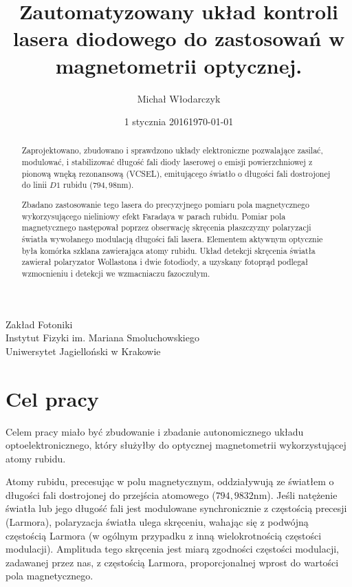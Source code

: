\documentclass[a4paper,10pt]{article}
\date{1 stycznia 2016}
\title{Zautomatyzowany układ kontroli lasera diodowego do zastosowań w magnetometrii optycznej.}
\author{Michał Włodarczyk}
\date{\footnotesize{\today}}
\begin{document}



\maketitle
\vspace{0.25\textheight}
\begin{large}
\centering
Zakład Fotoniki\\
Instytut Fizyki im. Mariana Smoluchowskiego\\
Uniwersytet Jagielloński w Krakowie\\
\end{large}
\thispagestyle{empty}

\newpage
\tableofcontents
\thispagestyle{plain}
\setcounter{page}{1}
\newpage

\begin{abstract}
Zaprojektowano, zbudowano i sprawdzono układy elektroniczne pozwalające zasilać, modulować, i stabilizować długość fali diody laserowej o emisji powierzchniowej z pionową wnęką rezonansową (VCSEL), emitującego światło o długości fali dostrojonej do linii $D1$ rubidu ($794{,}98 \mathrm{nm}$).

Zbadano zastosowanie tego lasera do precyzyjnego pomiaru pola magnetycznego wykorzysującego nieliniowy efekt Faradaya w parach rubidu. Pomiar pola magnetycznego następował poprzez obserwację skręcenia płaszczyzny polaryzacji światła wywołanego modulacją długości fali lasera. Elementem aktywnym optycznie była komórka szklana zawierająca atomy rubidu.  Układ detekcji skręcenia światła zawierał polaryzator Wollastona i dwie fotodiody, a uzyskany fotoprąd podlegał wzmocnieniu i detekcji we wzmacniaczu fazoczułym.  
\end{abstract}

\section{Cel pracy}

Celem pracy miało być zbudowanie i zbadanie autonomicznego układu optoelektronicznego, który służyłby do optycznej magnetometrii wykorzystującej atomy rubidu.

Atomy rubidu, precesując w polu magnetycznym, oddziaływują ze światłem o długości fali dostrojonej do przejścia atomowego ($794{,}9832$nm).
Jeśli natężenie światła lub jego długość fali jest modulowane synchronicznie z częstością precesji (Larmora), polaryzacja światła ulega skręceniu, wahając się z podwójną częstością Larmora (w ogólnym przypadku z inną wielokrotnością częstości modulacji).
Amplituda tego skręcenia jest miarą zgodności częstości modulacji, zadawanej przez nas, z częstością Larmora, proporcjonalnej wprost do wartości pola magnetycznego. 
\end{document}
